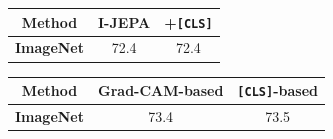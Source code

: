 \begin{figure}[t]
\begin{minipage}[t]{0.4\linewidth}
  \vspace{0pt} %
  \centering

  \label{tab:clstoken}
  \vspace{0.2em}
  \begin{tabular}{ccc}
    \toprule
    \textbf{Method} & I-JEPA & +\texttt{[CLS]}\\
    \midrule
    \textbf{ImageNet} & 72.4 & 72.4 \\
    \bottomrule
  \end{tabular}
\end{minipage}\hfill
\begin{minipage}[t]{0.55\linewidth}
  \vspace{0pt} %
  \centering
  \label{tab:atten_strategy}
  \vspace{0.2em}
  \begin{tabular}{ccc}
    \toprule
    \textbf{Method} & Grad-CAM-based & \texttt{[CLS]}-based\\
    \midrule
    \textbf{ImageNet} & 73.4 & 73.5 \\
    \bottomrule
  \end{tabular}
\end{minipage}
\end{figure}




